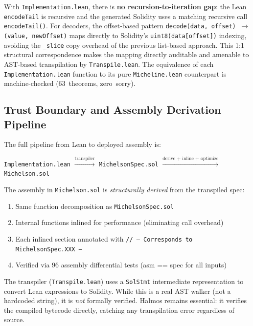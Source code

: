 \documentclass[11pt,a4paper]{article}
\begin{document}
With \texttt{Implemen\-tation.lean}, there is \textbf{no recursion-to-iteration
gap}: the Lean \texttt{encodeTail} is recursive and the generated Solidity uses
a matching recursive call \texttt{encodeTail()}.  For decoders, the offset-based
pattern \texttt{decode(data, offset) $\to$ (value, newOffset)} maps directly to
Solidity's \texttt{uint8(data[offset])} indexing, avoiding the
\texttt{\_slice} copy overhead of the previous list-based approach.
This 1:1 structural
correspondence makes the mapping directly auditable and amenable to AST-based
transpilation by \texttt{Transpile.lean}.  The equivalence of each
\texttt{Implemen\-tation.lean} function to its pure \texttt{Micheline.lean}
counterpart is machine-checked (63~theorems, zero~sorry).

\subsection{Trust Boundary and Assembly Derivation Pipeline}

The full pipeline from Lean to deployed assembly is:

\begin{center}
\small
\texttt{Implementation.lean} $\xrightarrow{\text{transpiler}}$
\texttt{MichelsonSpec.sol} $\xrightarrow{\text{derive + inline + optimize}}$
\texttt{Michelson.sol}
\end{center}

The assembly in \texttt{Michelson.sol} is \emph{structurally derived} from the
transpiled spec:
\begin{enumerate}[nosep]
  \item Same function decomposition as \texttt{MichelsonSpec.sol}
  \item Internal functions inlined for performance (eliminating call overhead)
  \item Each inlined section annotated with \texttt{// -- Corresponds to MichelsonSpec.XXX --}
  \item Verified via 96 assembly differential tests (asm == spec for all inputs)
\end{enumerate}

The transpiler (\texttt{Transpile.lean}) uses a \texttt{SolStmt} intermediate
representation to convert Lean expressions to Solidity. While this is a real
AST walker (not a hardcoded string), it is \emph{not} formally verified.
Halmos remains essential: it verifies the compiled bytecode directly, catching
any transpilation error regardless of source.
\end{document}
